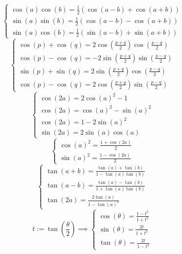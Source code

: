 \documentclass[french]{book}
\theoremstyle{plain}
\theoremstyle{definition}
\theoremstyle{remark}
\begin{document}
$$\begin{cases}
	\displaystyle\cos(a)\cos(b)=\frac{1}{2}\left(\cos(a-b)+\cos(a+b)\right)\\[3mm]
	\displaystyle\sin(a)\sin(b)=\frac{1}{2}\left(\cos(a-b)-\cos(a+b)\right)\\[3mm]
	\displaystyle\sin(a)\cos(b)=\frac{1}{2}\left(\sin(a-b)+\sin(a+b)\right)
\end{cases}$$
$$\begin{cases}
	\displaystyle\cos(p)+\cos(q)=2\cos\left(\frac{p+q}{2}\right)\cos\left(\frac{p-q}{2}\right)\\[3mm]
	\displaystyle\cos(p)-\cos(q)=-2\sin\left(\frac{p+q}{2}\right)\sin\left(\frac{p-q}{2}\right)\\[3mm]
	\displaystyle\sin(p)+\sin(q)=2\sin\left(\frac{p+q}{2}\right)\cos\left(\frac{p-q}{2}\right)\\[3mm]
	\displaystyle\cos(p)-\cos(q)=2\cos\left(\frac{p+q}{2}\right)\sin\left(\frac{p-q}{2}\right)
\end{cases}$$
$$\begin{cases}
	\cos(2a)=2\cos(a)^2-1\\
	\cos(2a)=\cos(a)^2-\sin(a)^2\\
	\cos(2a)=1-2\sin(a)^2\\
	\sin(2a)=2\sin(a)\cos(a)
\end{cases}$$
$$\begin{cases}
	\displaystyle\cos(a)^2=\frac{1+\cos(2a)}{2}\\[3mm]
	\displaystyle\sin(a)^2=\frac{1-\cos(2a)}{2}
\end{cases}$$
$$\begin{cases}
	\displaystyle\tan(a+b)=\frac{\tan(a)+\tan(b)}{1-\tan(a)\tan(b)}\\[3mm]
	\displaystyle\tan(a-b)=\frac{\tan(a)-\tan(b)}{1+\tan(a)\tan(b)}\\[3mm]
	\displaystyle\tan(2a)=\frac{2\tan(a)}{1-\tan(a)^2}
\end{cases}$$
$$t:=\displaystyle\tan\left(\frac{\theta}{2}\right)\implies\begin{cases}
	\displaystyle\cos(\theta)=\frac{1-t^2}{1+t^2}\\[3mm]
	\displaystyle\sin(\theta)=\frac{2t}{1+t^2}\\[3mm]
	\displaystyle\tan(\theta)=\frac{2t}{1-t^2}
\end{cases}$$
\end{document}
